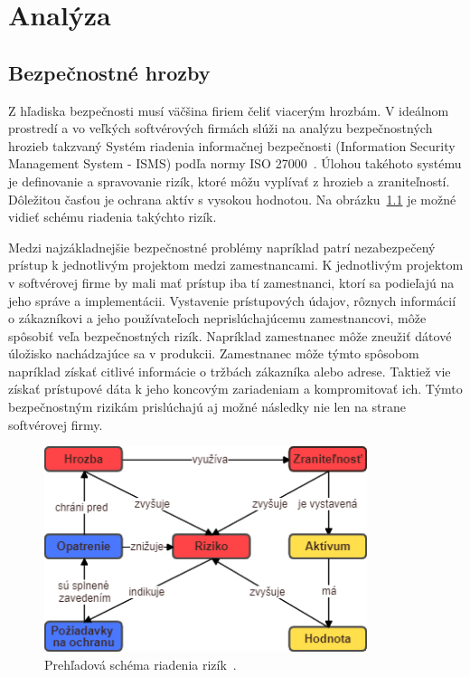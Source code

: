 \chapter{Analýza}\label{ch:analýza}

\section{Bezpečnostné hrozby}\label{sec:podsekcia-1}
\par Z hľadiska bezpečnosti musí väčšina firiem čeliť viacerým hrozbám. V ideálnom prostredí a vo veľkých softvérových
firmách slúži na analýzu bezpečnostných hrozieb takzvaný Systém riadenia informačnej bezpečnosti
(Information Security Management System - ISMS) podľa normy ISO 27000~\cite{ISO27001:2013}. Úlohou takéhoto systému je
definovanie a spravovanie rizík, ktoré môžu vyplívať z hrozieb a zraniteľností. Dôležitou časťou je ochrana aktív s vysokou
hodnotou. Na obrázku~\ref{obr_1} je možné vidieť schému riadenia takýchto rizík.

\par Medzi najzákladnejšie bezpečnostné problémy napríklad patrí nezabezpečený prístup k jednotlivým projektom medzi zamestnancami.
K jednotlivým projektom v softvérovej firme by mali mať prístup iba tí zamestnanci, ktorí sa podieľajú na jeho správe a implementácii.
Vystavenie prístupových údajov, rôznych informácií o zákazníkovi a jeho používateľoch neprislúchajúcemu zamestnancovi,
môže spôsobiť veľa bezpečnostných rizík. Napríklad zamestnanec môže zneužiť dátové úložisko nachádzajúce sa v produkcii.
Zamestnanec môže týmto spôsobom  napríklad získať citlivé informácie o tržbách zákazníka alebo adrese. Taktiež vie získať
prístupové dáta k jeho koncovým zariadeniam a kompromitovať ich. Týmto bezpečnostným rizikám prislúchajú aj možné následky
nie len na strane softvérovej firmy.

\begin{figure}[H]
\begin{center}\includegraphics[width=\textwidth,height=6cm,keepaspectratio=true]{assets/risks.png}\end{center}
\caption[Prehľadová schéma riadenia rizík]{Prehľadová schéma riadenia rizík~\cite{RiskManagement}.}\label{obr_1}
\end{figure}

